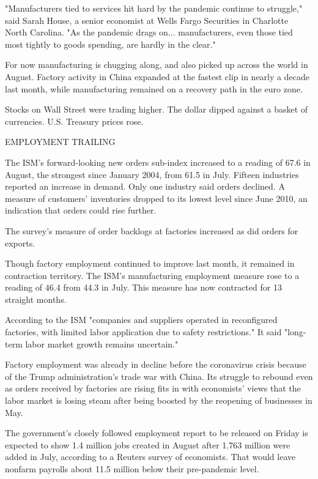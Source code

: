"Manufacturers tied to services hit hard by the pandemic continue to
struggle," said Sarah House, a senior economist at Wells Fargo
Securities in Charlotte North Carolina. "As the pandemic drags on...
manufacturers, even those tied most tightly to goods spending, are
hardly in the clear."

For now manufacturing is chugging along, and also picked up across the
world in August. Factory activity in China expanded at the fastest clip
in nearly a decade last month, while manufacturing remained on a
recovery path in the euro zone.

Stocks on Wall Street were trading higher. The dollar dipped against a
basket of currencies. U.S. Treasury prices rose.

EMPLOYMENT TRAILING

The ISM's forward-looking new orders sub-index increased to a reading of
67.6 in August, the strongest since January 2004, from 61.5 in July.
Fifteen industries reported an increase in demand. Only one industry
said orders declined. A measure of customers' inventories dropped to its
lowest level since June 2010, an indication that orders could rise
further.

The survey's measure of order backlogs at factories increased as did
orders for exports.

Though factory employment continued to improve last month, it remained
in contraction territory. The ISM's manufacturing employment measure
rose to a reading of 46.4 from 44.3 in July. This measure has now
contracted for 13 straight months.

According to the ISM "companies and suppliers operated in reconfigured
factories, with limited labor application due to safety restrictions."
It said "long-term labor market growth remains uncertain."

Factory employment was already in decline before the coronavirus crisis
because of the Trump administration's trade war with China. Its struggle
to rebound even as orders received by factories are rising fits in with
economists' views that the labor market is losing steam after being
boosted by the reopening of businesses in May.

The government's closely followed employment report to be released on
Friday is expected to show 1.4 million jobs created in August after
1.763 million were added in July, according to a Reuters survey of
economists. That would leave nonfarm payrolls about 11.5 million below
their pre-pandemic level.

